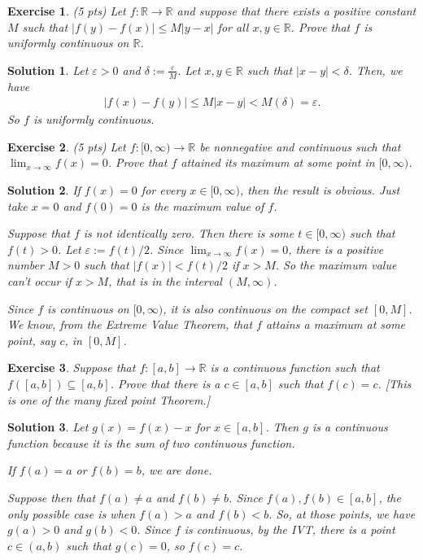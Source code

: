 \documentclass[12pt]{article}
\newcommand{\bR}{\mathbb{R}}
\newcommand{\ra}{\rightarrow}
\theoremstyle{plain}
\newtheorem{exer}{\textbf{Exercise}}}
\theoremstyle{plain}
\newtheorem*{sol}{\textbf{Solution}}}
\theoremstyle{plain}
\theoremstyle{plain}
\begin{document}
\begin{exer}
(5 pts)
Let $f : \bR \ra \bR$ and suppose that there exists a positive constant $M$ such that $|f(y) - f(x)| \leq M |y - x|$ for all $x, y \in \bR$. Prove that $f$ is uniformly continuous on $\bR$.
\end{exer}
\begin{sol}
Let $\varepsilon > 0$ and $\delta := \frac{\varepsilon}{M}$. Let $x, y \in \bR$ such that $|x - y| < \delta$. Then, we have
	\begin{align*}
	|f(x) - f(y)| \leq M |x - y| < M (\delta ) = \varepsilon .
	\end{align*}
So $f$ is uniformly continuous.
\end{sol}

\begin{exer}
(5 pts)
Let $f : [0, \infty ) \ra \bR$ be nonnegative and continuous such that $\lim_{x \ra \infty} f(x) = 0$. Prove that $f$ attained its maximum at some point in $[0 , \infty )$.
\end{exer}
\begin{sol}
If $f(x) = 0$ for every $x \in [0, \infty )$, then the result is obvious. Just take $x = 0$ and $f(0) = 0$ is the maximum value of $f$.

Suppose that $f$ is not identically zero. Then there is some $t \in [0, \infty )$ such that $f(t) > 0$. Let $\varepsilon := f(t)/2$. Since $\lim_{x \ra \infty} f(x) = 0$, there is a positive number $M > 0$ such that $|f(x)| < f(t)/2$ if $x > M$. So the maximum value can't occur if $x > M$, that is in the interval $(M, \infty )$.

Since $f$ is continuous on $[0, \infty )$, it is also continuous on the compact set $[0, M]$. We know, from the Extreme Value Theorem, that $f$ attains a maximum at some point, say $c$, in $[0, M]$. 
\end{sol}

\begin{exer}
Suppose that $f: [a, b] \ra \bR$ is a continuous function such that $f([a, b]) \subseteq [a, b]$. Prove that there is a $c \in [a, b]$ such that $f(c) = c$. [This is one of the many fixed point Theorem.]
\end{exer}
\begin{sol}
Let $g(x) = f(x) - x$ for $x \in [a, b]$. Then $g$ is a continuous function because it is the sum of two continuous function.

If $f(a) = a$ or $f(b) = b$, we are done. 

Suppose then that $f(a) \neq a$ and $f(b) \neq b$. Since $f(a), f(b) \in [a, b]$, the only possible case is when $f(a) > a$ and $f(b) < b$. So, at those points, we have $g(a) > 0$ and $g(b) < 0$. Since $f$ is continuous, by the IVT, there is a point $c \in (a, b)$ such that $g(c) = 0$, so $f(c) = c$.
\end{sol}
\end{document}
